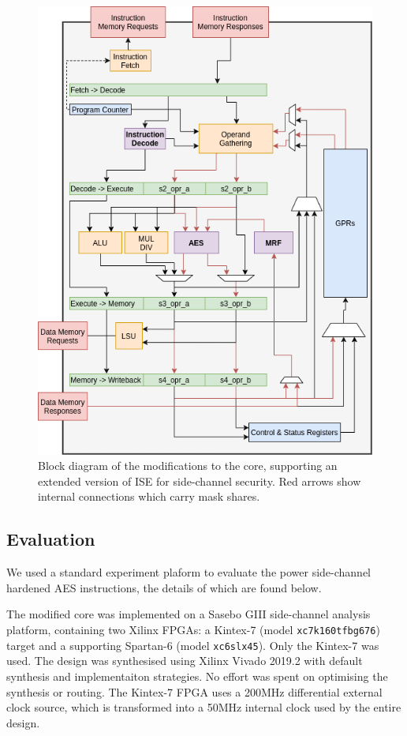 \begin{figure}
\centering
\includegraphics[scale=0.45,angle=90]{diagrams/scarv-cpu-uarch-sca.png}
\caption{Block diagram of the modifications to the  core,
supporting an extended version of ISE  for side-channel
security.
Red arrows show internal connections which carry mask shares.}
\label{fig:sca:uarch}
\end{figure}


\subsection{Evaluation}

We used a standard experiment plaform to evaluate the power side-channel
hardened AES  instructions, the details of which are found
below.

The modified  core was implemented on a
Sasebo GIII \cite{HKSS:12}
side-channel analysis platform, containing two Xilinx FPGAs:
a Kintex-7 
(model {\tt xc7k160tfbg676})
target
and
a supporting Spartan-6
(model {\tt xc6slx45}).
Only the Kintex-7 was used.
The design was synthesised using Xilinx Vivado 2019.2 with
default synthesis and implementaiton strategies.
No effort was spent on optimising the synthesis or routing.
The Kintex-7 FPGA uses a 200MHz differential external clock source, which is
transformed into a 50MHz internal clock used by the entire
design.

